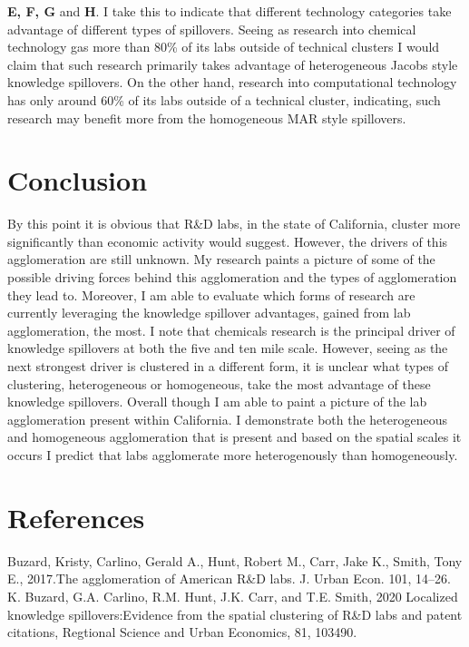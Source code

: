 \documentclass[12pt,letterpaper]{article}
\begin{document}
\textbf{E, F, G} and \textbf{H}. I take this to indicate that different technology categories take advantage of different types of spillovers. Seeing as research into chemical technology gas more than 80\% of its labs outside of technical clusters I would claim that such research primarily takes advantage of heterogeneous Jacobs style knowledge spillovers. On the other hand, research into computational technology has only around 60\% of its labs outside of a technical cluster, indicating, such research may benefit more from the homogeneous MAR style spillovers. 

\section{Conclusion}
By this point it is obvious that R\&D labs, in the state of California, cluster more significantly than economic activity would suggest. However, the drivers of this agglomeration are still unknown. My research paints a picture of some of the possible driving forces behind this agglomeration and the types of agglomeration they lead to. Moreover, I am able to evaluate which forms of research are currently leveraging the knowledge spillover advantages, gained from lab agglomeration, the most. I note that chemicals research is the principal driver of knowledge spillovers at both the five and ten mile scale. However, seeing as the next strongest driver is clustered in a different form, it is unclear what types of clustering, heterogeneous or homogeneous, take the most advantage of these knowledge spillovers. Overall though I am able to paint a picture of the lab agglomeration present within California. I demonstrate both the heterogeneous and homogeneous agglomeration that is present and based on the spatial scales it occurs I predict that labs agglomerate more heterogenously than homogeneously. 

\newpage
\section{References}    
 
Buzard, Kristy, Carlino, Gerald A., Hunt, Robert M., Carr, Jake K., Smith, Tony E., 2017.The agglomeration of American R\&D labs. J. Urban Econ. 101, 14–26.\\
 
\noindent K. Buzard, G.A. Carlino, R.M. Hunt, J.K. Carr, and T.E. Smith, 2020 Localized knowledge spillovers:Evidence from the spatial clustering of R\&D labs and patent citations, Regtional Science and Urban Economics, 81, 103490.\\
 
\end{document}
